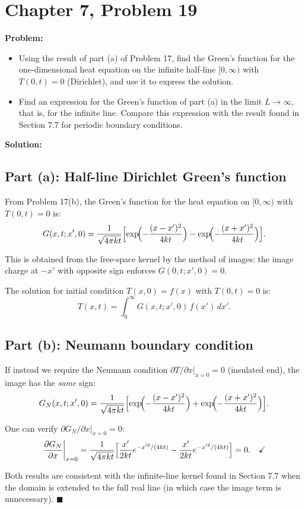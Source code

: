 \documentclass[12pt]{article}
\begin{document}
\section*{Chapter 7, Problem 19}

\textbf{Problem:}
\begin{itemize}
\item[a)] Using the result of part (a) of Problem 17, find the Green's function for the one-dimensional heat equation on the infinite half-line $[0,\infty)$ with $T(0,t) = 0$ (Dirichlet), and use it to express the solution.
\item[b)] Find an expression for the Green's function of part (a) in the limit $L \to \infty$, that is, for the infinite line. Compare this expression with the result found in Section 7.7 for periodic boundary conditions.
\end{itemize}

\bigskip
\textbf{Solution:}

\subsection*{Part (a): Half-line Dirichlet Green's function}

From Problem 17(b), the Green's function for the heat equation on $[0,\infty)$ with $T(0,t)=0$ is:
\[
G(x,t;x',0) = \frac{1}{\sqrt{4\pi kt}}\Bigl[\exp\!\Bigl(-\frac{(x-x')^2}{4kt}\Bigr) - \exp\!\Bigl(-\frac{(x+x')^2}{4kt}\Bigr)\Bigr].
\]

This is obtained from the free-space kernel by the method of images: the image charge at $-x'$ with opposite sign enforces $G(0,t;x',0)=0$.

The solution for initial condition $T(x,0) = f(x)$ with $T(0,t) = 0$ is:
\[
T(x,t) = \int_0^{\infty} G(x,t;x',0)\,f(x')\,dx'.
\]

\subsection*{Part (b): Neumann boundary condition}

If instead we require the Neumann condition $\partial T/\partial x\big|_{x=0} = 0$ (insulated end), the image has the \textit{same} sign:
\[
G_N(x,t;x',0) = \frac{1}{\sqrt{4\pi kt}}\Bigl[\exp\!\Bigl(-\frac{(x-x')^2}{4kt}\Bigr) + \exp\!\Bigl(-\frac{(x+x')^2}{4kt}\Bigr)\Bigr].
\]

One can verify $\partial G_N/\partial x|_{x=0} = 0$:
\[
\frac{\partial G_N}{\partial x}\bigg|_{x=0} = \frac{1}{\sqrt{4\pi kt}}\Bigl[\frac{x'}{2kt}e^{-x'^2/(4kt)} - \frac{x'}{2kt}e^{-x'^2/(4kt)}\Bigr] = 0. \quad \checkmark
\]

Both results are consistent with the infinite-line kernel found in Section 7.7 when the domain is extended to the full real line (in which case the image term is unnecessary). $\blacksquare$
\end{document}
